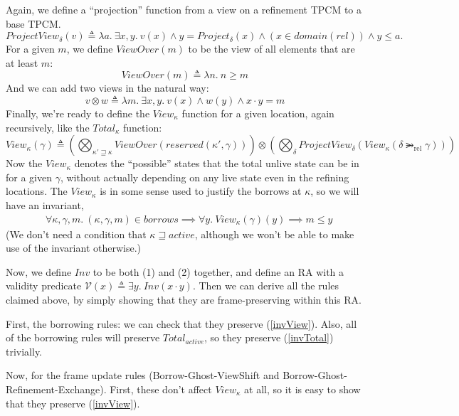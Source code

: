 \documentclass{article}
\DeclareMathOperator{\rel}{rel}
\renewcommand{\eqdef}{\triangleq}
\newcommand{\refines}{\rightarrowgtr}
\newcommand{\ltGe}{\sqsupseteq}
\newcommand\Bigcircle{\raisebox{-0.5mm}{\scalebox{1.7}{$\bigcirc$}}}
\begin{document}
Again, we define a ``projection'' function from a view on a refinement TPCM to a base TPCM.
\[
  ProjectView_\delta(v) \eqdef \lambda a .~
      \exists x, y .~ v(x) \land y = Project_\delta(x) \land (x \in domain(rel)) \land y \le a.
\]
For a given $m$, we define $ViewOver(m)$ to be the view of all elements that are at least $m$:
\[
  ViewOver(m) \eqdef \lambda n .~ n \ge m
\]
And we can add two views in the natural way:
\[
  v \otimes w \eqdef \lambda m .~ \exists x, y .~ v(x) \land w(y) \land x \cdot y = m
\]
Finally, we're ready to define the $View_\kappa$ function for a given location, again recursively, like the $Total_\kappa$ function:
\[
  View_\kappa(\gamma) \eqdef 
      \left(
        \bigotimes_{\kappa' \ltGe \kappa} ViewOver(reserved(\kappa',\gamma))
      \right) \otimes
      \left(
        \bigotimes_{\delta} ProjectView_\delta\left(View_\kappa(\delta \refines_{\rel} \gamma)\right)
      \right)
\]
Now the $View_\kappa$ denotes the ``possible'' states that the total unlive state can be in
for a given $\gamma$, without actually depending on any live state even in the refining locations. The $View_\kappa$ is in some sense used to justify the borrows at $\kappa$, so we will have an invariant,
\begin{align}
  & \forall \kappa, \gamma, m .~
  (\kappa, \gamma, m) \in borrows \implies \forall y .~ View_\kappa(\gamma)(y) \implies m \le y
  \label{invView}
\end{align}
(We don't need a condition that $\kappa \ltGe active$, although we won't be able to make use
of the invariant otherwise.)

Now, we define $Inv$ to be both (1) and (2) together, and define an RA with a validity predicate $\mathcal{V}(x) \eqdef \exists y.~ Inv(x \cdot y)$. Then we can derive all the rules
claimed above, by simply showing that they are frame-preserving within this RA.

First, the borrowing rules: we can check that they preserve (\ref{invView}).
Also, all of the borrowing rules will preserve $Total_{active}$,
so they preserve (\ref{invTotal}) trivially.

Now, for the frame update rules (Borrow-Ghost-ViewShift and Borrow-Ghost-Refinement-Exchange).
First, these don't affect $View_{\kappa}$ at all, so it is easy to show that they preserve
(\ref{invView}).
\end{document}
